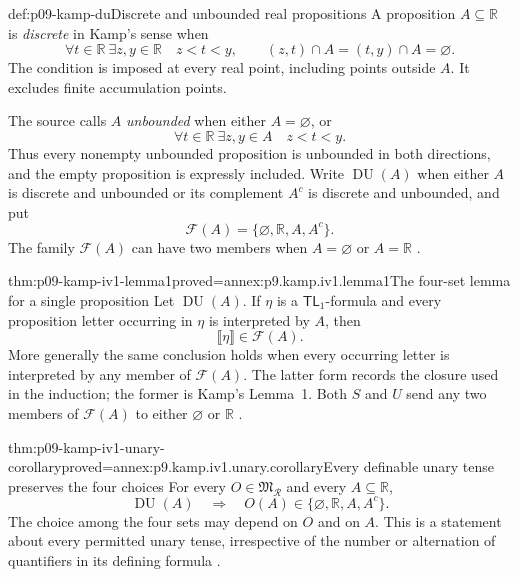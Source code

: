 \begin{hbdefinition}{def:p09-kamp-du}{Discrete and unbounded real propositions}
A proposition \(A\subseteq\mathbb R\) is \emph{discrete} in
Kamp's sense when
\[
 \forall t\in\mathbb R\ \exists z,y\in\mathbb R\quad
 z<t<y,\qquad (z,t)\cap A=(t,y)\cap A=\varnothing.
\]
The condition is imposed at every real point, including points outside
\(A\). It excludes finite accumulation points.

The source calls \(A\) \emph{unbounded} when either
\(A=\varnothing\), or
\[
 \forall t\in\mathbb R\ \exists z,y\in A\quad z<t<y.
\]
Thus every nonempty unbounded proposition is unbounded in both
directions, and the empty proposition is expressly included.
Write \(\operatorname{DU}(A)\) when either \(A\) is
discrete and unbounded or its complement \(A^c\) is discrete
and unbounded, and put
\[
                  \mathcal F(A)=\{\varnothing,\mathbb R,A,A^c\}.
\]
The family \(\mathcal F(A)\) can have two members when
\(A=\varnothing\) or \(A=\mathbb R\)
\cite[ch.~IV, def.~1, p.~96]{Kamp1968}.
\end{hbdefinition}

\begin{hblemma}{thm:p09-kamp-iv1-lemma1}{proved=annex:p9.kamp.iv1.lemma1}{The four-set lemma for a single proposition}
Let \(\operatorname{DU}(A)\). If \(\eta\) is a
\(\mathsf{TL}_1\)-formula and every proposition letter occurring
in \(\eta\) is interpreted by \(A\), then
\[
                    \llbracket\eta\rrbracket\in\mathcal F(A).
\]
More generally the same conclusion holds when every occurring letter
is interpreted by any member of \(\mathcal F(A)\). The latter
form records the closure used in the induction; the former is Kamp's
Lemma~1. Both \(S\) and \(U\) send any two members of
\(\mathcal F(A)\) to either \(\varnothing\) or
\(\mathbb R\)
\cite[ch.~IV, lemma~1, pp.~96--97]{Kamp1968}.
\end{hblemma}

\begin{hbcorollary}{thm:p09-kamp-iv1-unary-corollary}{proved=annex:p9.kamp.iv1.unary.corollary}{Every definable unary tense preserves the four choices}
For every \(O\in\mathfrak M_{\mathcal R}\) and every
\(A\subseteq\mathbb R\),
\[
      \operatorname{DU}(A)\quad\Longrightarrow\quad
      O(A)\in\{\varnothing,\mathbb R,A,A^c\}.
\]
The choice among the four sets may depend on \(O\) and on \(A\).
This is a statement about every permitted unary tense, irrespective
of the number or alternation of quantifiers in its defining formula
\cite[ch.~IV, corollary to lemma~1, p.~97]{Kamp1968}.
\end{hbcorollary}

